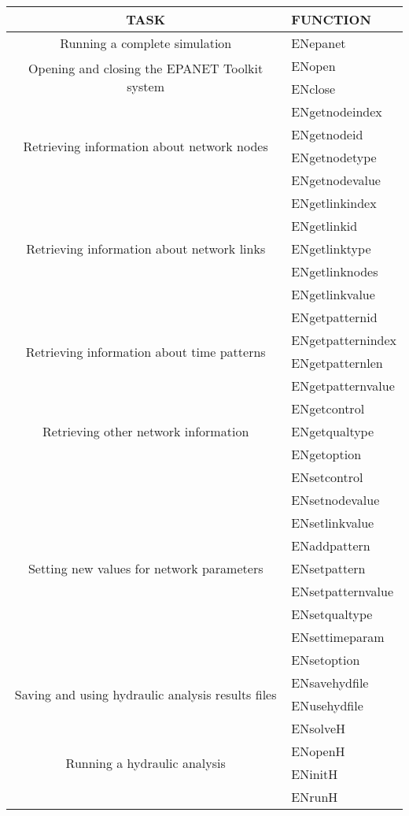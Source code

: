 \begin{longtable}{|c| l|}
\hline
TASK&FUNCTION \\
\hline
\hline
\multirow{1}{*}{Running a complete simulation}
&ENepanet\\
\hline
\multirow{2}{*}{Opening and closing the EPANET Toolkit system}
&ENopen \\
&ENclose \\
\hline
\multirow{4}{*}{Retrieving information about network nodes}
&ENgetnodeindex\\
&ENgetnodeid\\
&ENgetnodetype\\
&ENgetnodevalue\\
\hline
\multirow{5}{*}{Retrieving information about network links}
&ENgetlinkindex\\
&ENgetlinkid\\
&ENgetlinktype\\
&ENgetlinknodes\\
&ENgetlinkvalue\\
\hline
\multirow{4}{*}{Retrieving information about time patterns}
&ENgetpatternid\\
&ENgetpatternindex\\
&ENgetpatternlen\\
&ENgetpatternvalue\\
\hline
\multirow{3}{*}{Retrieving other network information}
&ENgetcontrol\\
&ENgetqualtype\\
&ENgetoption\\
\hline
\multirow{9}{*}{Setting new values for network parameters}
&ENsetcontrol\\
&ENsetnodevalue\\
&ENsetlinkvalue\\
&ENaddpattern\\
&ENsetpattern\\
&ENsetpatternvalue\\
&ENsetqualtype\\
&ENsettimeparam\\
&ENsetoption\\
\hline
\multirow{2}{*}{Saving and using hydraulic analysis results files}
&ENsavehydfile\\
&ENusehydfile\\
\hline
\multirow{6}{*}{Running a hydraulic analysis}
&ENsolveH\\
&ENopenH\\
&ENinitH\\
&ENrunH\\

\end{longtable}
